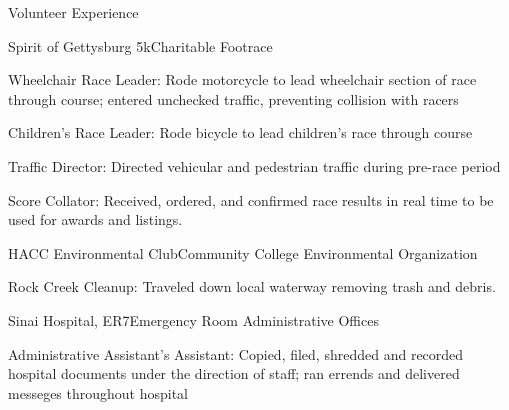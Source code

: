 \documentclass{resume} %
\begin{document}
\begin{rSection}{Volunteer Experience}




\begin{rSubsection}{Spirit of Gettysburg 5k}{}{Charitable Footrace}{}
\item Wheelchair Race Leader: Rode motorcycle to lead wheelchair section of race through course; entered unchecked traffic, preventing collision with racers
\item Children's Race Leader: Rode bicycle to lead children's race through course
\item Traffic Director: Directed vehicular and pedestrian traffic during pre-race period
\item Score Collator: Received, ordered, and confirmed race results in real time to be used for awards and listings.
\end{rSubsection}




\begin{rSubsection}{HACC Environmental Club}{}{Community College Environmental Organization}{}
\item Rock Creek Cleanup: Traveled down local waterway removing trash and debris.
\end{rSubsection}


\begin{rSubsection}{Sinai Hospital, ER7}{}{Emergency Room Administrative Offices}{}
\item Administrative Assistant's Assistant: Copied, filed, shredded and recorded hospital documents under the direction of staff; ran errends and delivered messeges throughout hospital
\end{rSubsection}

\end{rSection}
\end{document}
